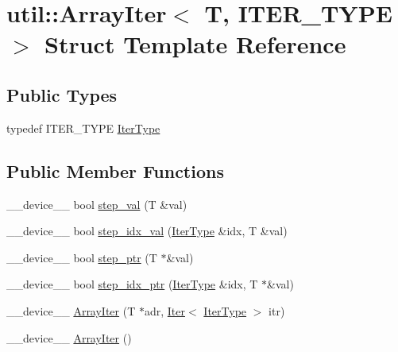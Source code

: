 \hypertarget{structutil_1_1ArrayIter}{\section{util\-:\-:Array\-Iter$<$ T, I\-T\-E\-R\-\_\-\-T\-Y\-P\-E $>$ Struct Template Reference}
\label{structutil_1_1ArrayIter}
}
\subsection*{Public Types}
\begin{DoxyCompactItemize}
\item 
typedef I\-T\-E\-R\-\_\-\-T\-Y\-P\-E \hyperlink{structutil_1_1ArrayIter_a6ff2ec73e2fd7bb312b4f505ad91bdbc}{Iter\-Type}
\end{DoxyCompactItemize}
\subsection*{Public Member Functions}
\begin{DoxyCompactItemize}
\item 
\-\_\-\-\_\-device\-\_\-\-\_\- bool \hyperlink{structutil_1_1ArrayIter_a3ba648a33f387eddaa49e3effb6d5859}{step\-\_\-val} (T \&val)
\item 
\-\_\-\-\_\-device\-\_\-\-\_\- bool \hyperlink{structutil_1_1ArrayIter_a21bc8290b3714af4692d7f1ab0ece8f4}{step\-\_\-idx\-\_\-val} (\hyperlink{structutil_1_1ArrayIter_a6ff2ec73e2fd7bb312b4f505ad91bdbc}{Iter\-Type} \&idx, T \&val)
\item 
\-\_\-\-\_\-device\-\_\-\-\_\- bool \hyperlink{structutil_1_1ArrayIter_a8142a862009faf173cb6a8ec86095bc4}{step\-\_\-ptr} (T $\ast$\&val)
\item 
\-\_\-\-\_\-device\-\_\-\-\_\- bool \hyperlink{structutil_1_1ArrayIter_aff4525e2234d4bc9c54e69a5549a5582}{step\-\_\-idx\-\_\-ptr} (\hyperlink{structutil_1_1ArrayIter_a6ff2ec73e2fd7bb312b4f505ad91bdbc}{Iter\-Type} \&idx, T $\ast$\&val)
\item 
\-\_\-\-\_\-device\-\_\-\-\_\- \hyperlink{structutil_1_1ArrayIter_a3501026358ab052e59fadfe324320ff0}{Array\-Iter} (T $\ast$adr, \hyperlink{structutil_1_1Iter}{Iter}$<$ \hyperlink{structutil_1_1ArrayIter_a6ff2ec73e2fd7bb312b4f505ad91bdbc}{Iter\-Type} $>$ itr)
\item 
\-\_\-\-\_\-device\-\_\-\-\_\- \hyperlink{structutil_1_1ArrayIter_a2403d2ed1cec2b988ccbaee38374152f}{Array\-Iter} ()
\end{DoxyCompactItemize}
